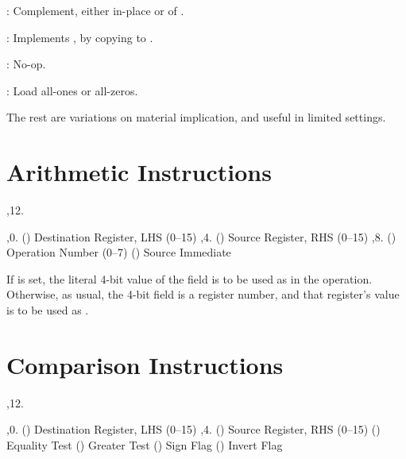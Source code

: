 : Complement, either in-place or of .

: Implements , by copying  to .

: No-op.

: Load all-ones or all-zeros.

The rest are variations on material implication, and useful in limited
settings.

\section{Arithmetic Instructions}

\noindent\ins{},12. 

\li \ins{},0. () Destination Register, LHS (0--15)
\li \ins{},4. () Source Register, RHS (0--15)
\li \ins{},8. () Operation Number (0--7)
\li \ins{} () Source Immediate

If  is set, the literal 4-bit value of the  field is to be used
as  in the operation. Otherwise, as usual, the 4-bit field is a register
number, and that register's value is to be used as .

\bigskip
{
	\offinterlineskip
}
\bigskip

\section{Comparison Instructions}

\noindent\ins{},12. 

\li \ins{},0. () Destination Register, LHS (0--15)
\li \ins{},4. () Source Register, RHS (0--15)
\li \ins{} () Equality Test
\li \ins{} () Greater Test
\li \ins{} () Sign Flag
\li \ins{} () Invert Flag

